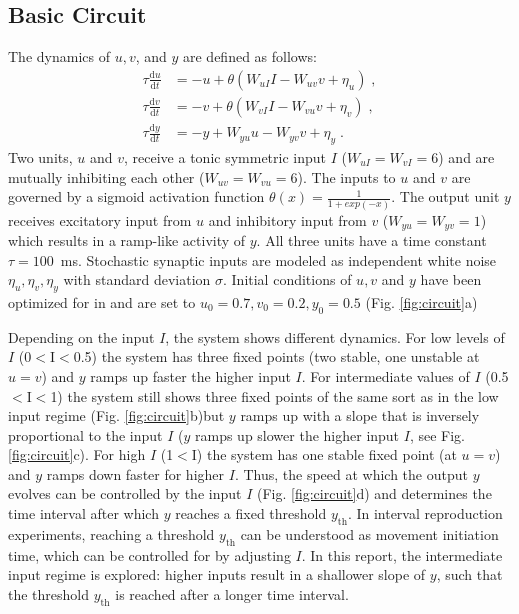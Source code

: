 \documentclass[10pt]{article}
\begin{document}
\subsection{Basic Circuit}
The dynamics of $u, v$, and $y$ are defined as follows:
\begin{equation} \label{circuit}
	\begin{split}
	\tau\frac{\text{d}u}{\text{d}t} & = -u + \theta(W_{uI}I - W_{uv}v + \eta_u) \;, \\
	\tau\frac{\text{d}v}{\text{d}t} & = -v + \theta(W_{vI}I - W_{vu}v + \eta_v) \;, \\
	\tau\frac{\text{d}y}{\text{d}t} & = -y + W_{yu}u - W_{yv}v + \eta_y \;.
	\end{split}
\end{equation}
Two units, $u$ and $v$, receive a tonic symmetric input $I$ ($W_{uI}=W_{vI}=6$) and are mutually inhibiting each other ($W_{uv}=W_{vu}=6$). 
The inputs to $u$ and $v$ are governed by a sigmoid activation function $\theta(x) = \frac{1}{1+exp(-x)}$.
The output unit $y$ receives excitatory input from $u$ and inhibitory input from $v$ ($W_{yu}=W_{yv}=1$) which results in a ramp-like activity of $y$.
All three units have a time constant $\tau = 100$~ms. 
Stochastic synaptic inputs are modeled as independent white noise $\eta_u, \eta_v, \eta_y$ with standard deviation $\sigma$.
Initial conditions of $u, v$ and $y$ have been optimized for in \cite{Egger2020} and are set to $u_0=0.7, v_0=0.2, y_0=0.5$ (Fig. \ref{fig:circuit}a)

Depending on the input $I$, the system shows different dynamics. For low levels of $I$ (0$<$I$<$0.5) the system has three fixed points (two stable, one unstable at $u=v$) and $y$ ramps up faster the higher input $I$. 
For intermediate values of $I$ (0.5$<$I$<$1) the system still shows three fixed points of the same sort as in the low input regime (Fig. \ref{fig:circuit}b)but $y$ ramps up with a slope that is inversely proportional to the input $I$ ($y$ ramps up slower the higher input $I$, see Fig. \ref{fig:circuit}c). 
For high $I$ (1$<$I) the system has one stable fixed point (at $u=v$) and $y$ ramps down faster for higher $I$.
Thus, the speed at which the output $y$ evolves can be controlled by the input $I$ (Fig. \ref{fig:circuit}d) and determines the time interval after which $y$ reaches a fixed threshold $y_{\text{th}}$. 
In interval reproduction experiments, reaching a threshold $y_{\text{th}}$ can be understood as movement initiation time, which can be controlled for by adjusting $I$.
In this report, the intermediate input regime is explored: higher inputs result in a shallower slope of $y$, such that the threshold $y_{\text{th}}$ is reached after a longer time interval.
\end{document}
